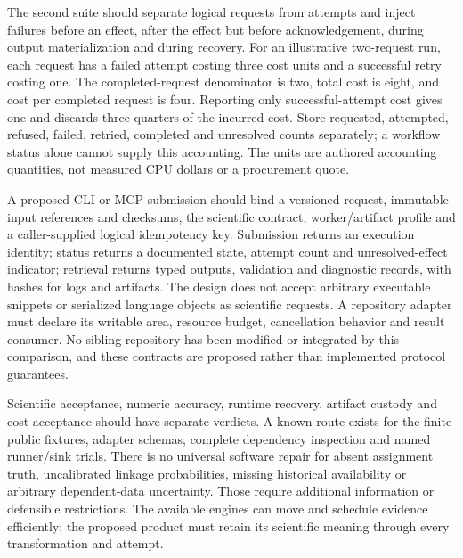 The second suite should separate logical requests from attempts and inject failures before an effect, after the effect but before acknowledgement, during output materialization and during recovery. For an illustrative two-request run, each request has a failed attempt costing three cost units and a successful retry costing one. The completed-request denominator is two, total cost is eight, and cost per completed request is four. Reporting only successful-attempt cost gives one and discards three quarters of the incurred cost. Store requested, attempted, refused, failed, retried, completed and unresolved counts separately; a workflow status alone cannot supply this accounting. The units are authored accounting quantities, not measured CPU dollars or a procurement quote.~\citep{exec25_dww_choice}

A proposed CLI or MCP submission should bind a versioned request, immutable input references and checksums, the scientific contract, worker/artifact profile and a caller-supplied logical idempotency key. Submission returns an execution identity; status returns a documented state, attempt count and unresolved-effect indicator; retrieval returns typed outputs, validation and diagnostic records, with hashes for logs and artifacts. The design does not accept arbitrary executable snippets or serialized language objects as scientific requests. A repository adapter must declare its writable area, resource budget, cancellation behavior and result consumer. No sibling repository has been modified or integrated by this comparison, and these contracts are proposed rather than implemented protocol guarantees.~\citep{exec24_openlineage_source,exec24_openlineage_reference,exec25_dww_choice}

Scientific acceptance, numeric accuracy, runtime recovery, artifact custody and cost acceptance should have separate verdicts. A known route exists for the finite public fixtures, adapter schemas, complete dependency inspection and named runner/sink trials. There is no universal software repair for absent assignment truth, uncalibrated linkage probabilities, missing historical availability or arbitrary dependent-data uncertainty. Those require additional information or defensible restrictions. The available engines can move and schedule evidence efficiently; the proposed product must retain its scientific meaning through every transformation and attempt.~\citep{exec25_dww_choice}


